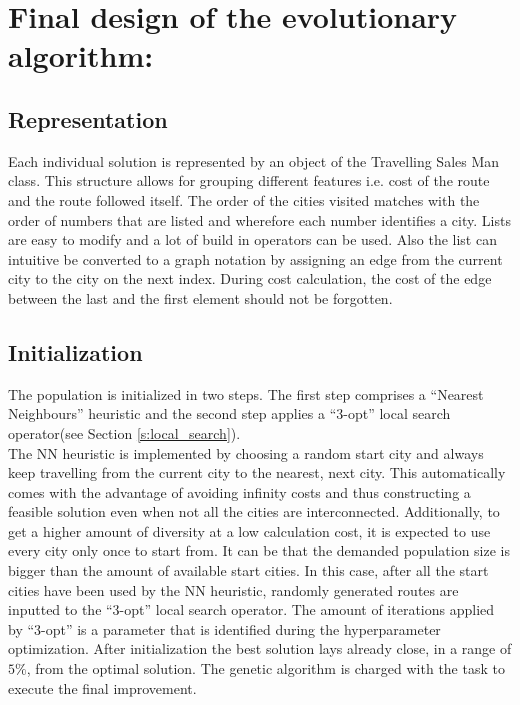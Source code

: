 \documentclass[a4paper,10pt]{article}
\newcommand{\ReplaceMe}[1]{{\color{blue}#1}}
\newcommand{\RemoveMe}[1]{{\color{purple}#1}}
\begin{document}
\section{Final design of the evolutionary algorithm:} 
%

\subsection{Representation}

Each individual solution is represented by an object of the Travelling Sales Man class. This structure allows for grouping different features i.e. cost of the route and the route followed itself. The order of the cities visited matches with the order of numbers that are listed and wherefore each number identifies a city.  Lists are easy to modify and a lot of build in operators can be used. Also the list can intuitive be converted to a graph notation by assigning an edge from the current city to the city on the next index. During cost calculation, the cost of the edge between the last and the first element should not be forgotten.

\subsection{Initialization}

The population is initialized in two steps. The first step comprises a ``Nearest Neighbours'' heuristic and the second step applies a ``3-opt'' local search operator(see Section \ref{s:local_search}). \\The NN heuristic is implemented by choosing a random start city and always keep travelling from the current city to the nearest, next city. This automatically comes with the advantage of avoiding infinity costs and thus constructing a feasible solution even when not all the cities are interconnected. Additionally, to get a higher amount of diversity at a low calculation cost, it is expected to use every city only once to start from. It can be that the demanded population size is bigger than the amount of available start cities. In this case, after all the start cities have been used by the NN heuristic, randomly generated routes are inputted to the ``3-opt'' local search operator. The amount of iterations applied by ``3-opt'' is a parameter that is identified during the hyperparameter optimization. After initialization the best solution lays already close, in a range of $5\%$, from the optimal solution. The genetic algorithm is charged with the task to execute the final improvement.\\
\end{document}
